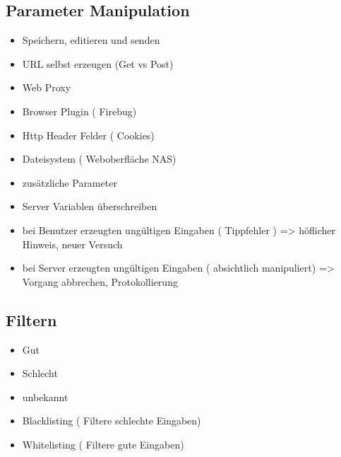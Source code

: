 \subsection*{ Parameter Manipulation}
\begin{itemize}
	\item Speichern, editieren und senden
	\item URL selbst erzeugen (Get vs Post)
	\item Web Proxy
	\item Browser Plugin ( Firebug)
	\item Http Header Felder ( Cookies)
	\item Dateisystem ( Weboberfläche NAS)
	\item zusätzliche Parameter
	\item Server Variablen überschreiben
	\item bei Benutzer erzeugten ungültigen Eingaben ( Tippfehler ) => höflicher Hinweis, neuer Versuch
	\item bei Server erzeugten ungültigen Eingaben ( absichtlich manipuliert) => Vorgang abbrechen, Protokollierung
\end{itemize}

\subsection*{ Filtern}
\begin{itemize}
	\item Gut
	\item Schlecht
	\item unbekannt
	\item Blacklisting ( Filtere schlechte Eingaben)
	\item Whitelisting ( Filtere gute Eingaben)
\end{itemize}



